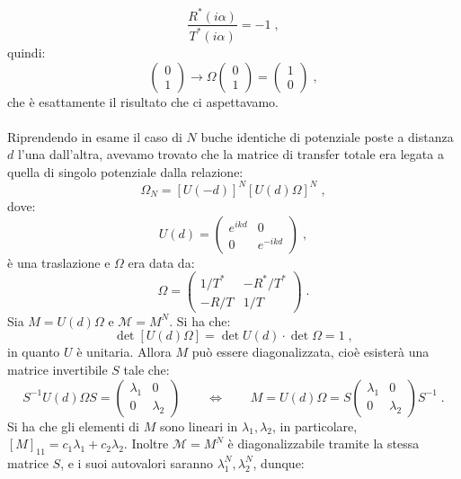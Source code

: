 \documentclass[10pt,a4paper]{report}
\theoremstyle{definition}
\numberwithin{equation}{section}
\begin{document}
$$
\frac{R^*(i\alpha)}{T^*(i\alpha)}=-1\;,
$$
quindi:
$$
\left(\begin{matrix}
0 \\
1
\end{matrix}\right)\longrightarrow \Omega\left(
\begin{matrix}
0 \\
1
\end{matrix}\right)=\left(\begin{matrix}
1 \\
0
\end{matrix}\right)\;,
$$
che è esattamente il risultato che ci aspettavamo. \\
\\
Riprendendo in esame il caso di $N$ buche identiche di potenziale poste a distanza $d$ l'una dall'altra, avevamo trovato che la matrice di transfer totale era legata a quella di singolo potenziale dalla relazione:
$$
\Omega_N=[U(-d)]^N[U(d)\Omega]^N\;,
$$
dove:
\begin{equation}
U(d)=\left(\begin{matrix}
e^{ikd} & 0 \\
0 & e^{-ikd}
\end{matrix}\right)\;,
\end{equation}
è una traslazione e $\Omega$ era data da:
\begin{equation}
\Omega=\left(
\begin{matrix}
1/T^* & -R^*/T^* \\
-R/T & 1/T
\end{matrix}\right)\;.
\end{equation}
Sia $M=U(d)\Omega$ e $\mathcal{M}=M^N$. Si ha che:
\begin{equation}
\det[U(d)\Omega]=\det U(d)\cdot\det\Omega=1\;,
\end{equation}
in quanto $U$ è unitaria. Allora $M$ può essere diagonalizzata, cioè esisterà una matrice invertibile $S$ tale che:
\begin{equation}
S^{-1}U(d)\Omega S=\left(\begin{matrix}
\lambda_1 & 0 \\
0 & \lambda_2
\end{matrix}\right) \qquad\Longleftrightarrow\qquad M=U(d)\Omega=S\left(\begin{matrix}
\lambda_1 & 0 \\
0 & \lambda_2
\end{matrix}\right)S^{-1}\;.
\end{equation}
Si ha che gli elementi di $M$ sono lineari in $\lambda_1,\lambda_2$, in particolare, $[M]_{11}=c_1\lambda_1+c_2\lambda_2$. Inoltre $\mathcal{M}=M^N$ è diagonalizzabile tramite la stessa matrice $S$, e i suoi autovalori saranno $\lambda_1^N,\lambda_2^N$, dunque:
\end{document}
